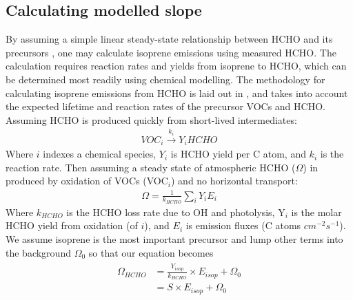     
  \subsection{Calculating modelled slope}
    \label{BioIsop:Method:slope}
    
    By assuming a simple linear steady-state relationship between HCHO and its precursors \parencite{Palmer2003, Palmer2006, Millet2006}, one may calculate isoprene emissions using measured HCHO.
    The calculation requires reaction rates and yields from isoprene to HCHO, which can be determined most readily using chemical modelling.
    The methodology for calculating isoprene emissions from HCHO is laid out in \textcite{Palmer2003}, and takes into account the expected lifetime and reaction rates of the precursor VOCs and HCHO.
    Assuming HCHO is produced quickly from short-lived intermediates:
    \begin{eqnarray*}
      VOC_i \overset{k_i}{\rightarrow} Y_i HCHO
    \end{eqnarray*}
    Where $i$ indexes a chemical species, $Y_i$ is HCHO yield per C atom, and $k_i$ is the reaction rate.
    Then assuming a steady state of atmospheric HCHO ($\Omega$) in \moleccm produced by oxidation of VOCs (VOC$_i$) and no horizontal transport:
    \begin{eqnarray*}
      \Omega = \frac{1}{k_{HCHO}} \sum_{i} Y_i E_i
    \end{eqnarray*}
    Where $k_{HCHO}$ is the HCHO loss rate due to OH and photolysis, Y$_i$ is the molar HCHO yield from oxidation (of $i$), and $E_i$ is emission fluxes (C atoms $cm^{-2} s^{-1}$).
    We assume isoprene is the most important precursor and lump other terms into the background $\Omega_0$ so that our equation becomes 
    \begin{eqnarray} 
    \label{BioIsop:Method:slope:eqn_isop_to_hcho}
    \begin{split}
      \Omega_{HCHO} 
      &= \frac{Y_{isop}}{k_{HCHO}} \times E_{isop} + \Omega_0 \\
      & = S \times E_{isop} + \Omega_0
    \end{split} \end{eqnarray}
    
